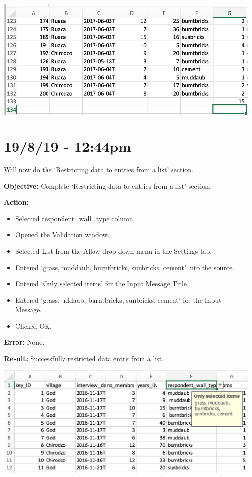 \documentclass{article}
\begin{document}
\includegraphics[width=\textwidth]{figd.png}

\section*{19/8/19 - 12:44pm}

Will now do the ‘Restricting data to entries from a list’ section.

\textbf{Objective:} Complete ‘Restricting data to entries from a list’ section.

\textbf{Action:}
\begin{itemize}
    \item Selected respondent\_wall\_type column.
    \item Opened the Validation window.
    \item Selected List from the Allow drop down menu in the Settings tab.
    \item Entered ‘grass, muddaub, burntbricks, sunbricks, cement’ into the source.
    \item Entered ‘Only selected items’ for the Input Message Title.
    \item Entered ‘grass, uddaub, burntbricks, sunbricks, cement’ for the Input Message.
    \item Clicked OK.
\end{itemize}

\textbf{Error:} None.

\textbf{Result:} Successfully restricted data entry from a list.

\includegraphics[width=\textwidth]{fige.png}
\end{document}
